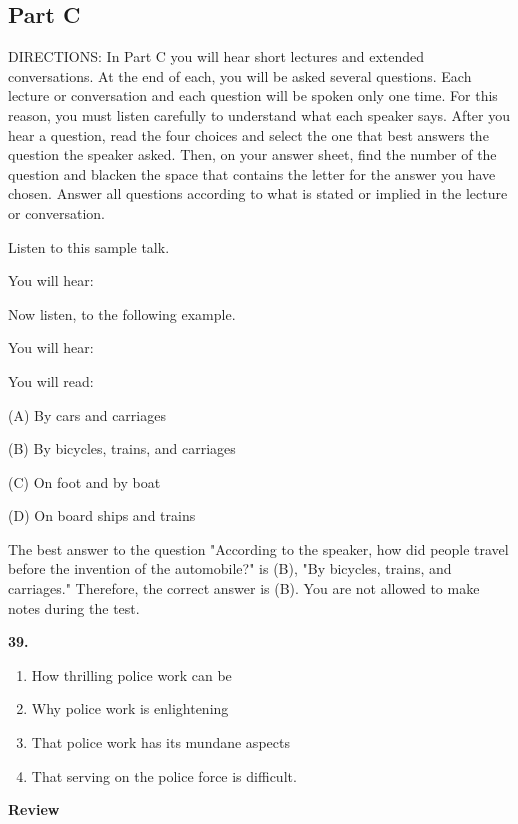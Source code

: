 \documentclass[12pt]{article}
\begin{document}
\subsection*{Part C}
DIRECTIONS: In Part C you will hear short lectures and extended conversations. At the end of each, you will be asked several questions. Each lecture or conversation and each question will be spoken only one time. For this reason, you must listen carefully to understand what each speaker says. After you hear a question, read the four choices and select the one that best answers the question the speaker asked. Then, on your answer sheet, find the number of the question and blacken the space that contains the letter for the answer you have chosen. Answer all questions according to what is stated or implied in the lecture or conversation.\par
\begin{exampleblock}
Listen to this sample talk.\par
You will hear:\par
Now listen, to the following example.\par
You will hear:\par
You will read:\par
(A) By cars and carriages\par
(B) By bicycles, trains, and carriages\par
(C) On foot and by boat\par
(D) On board ships and trains\par
The best answer to the question "According to the speaker, how did people travel before the invention of the automobile?" is (B), "By bicycles, trains, and carriages." Therefore, the correct answer is (B). You are not allowed to make notes during the test.\par
\end{exampleblock}
\noindent\textbf{39.}
\begin{enumerate}[label=(\Alph*),leftmargin=*,itemsep=0.2em]
\item How thrilling police work can be
\item Why police work is enlightening
\item That police work has its mundane aspects
\item That serving on the police force is difficult.
\end{enumerate}
\par
\begingroup
\setlength{\parskip}{0pt}
\setlength{\parindent}{0pt}
\textbf{Review}\par
\end{document}
